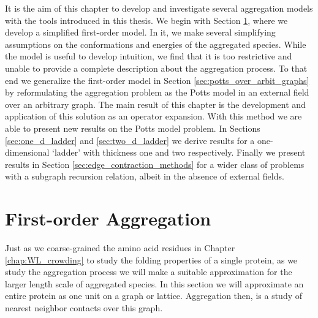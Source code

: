 It is the aim of this chapter to develop and investigate several aggregation models with the tools introduced in this thesis. We begin with Section \ref{sec:first_order_aggregation}, where we develop a simplified first-order model. In it, we make several simplifying assumptions on the conformations and energies of the aggregated species. While the model is useful to develop intuition, we find that it is too restrictive and unable to provide a complete description about the aggregation process. To that end we generalize the first-order model in Section \ref{sec:potts_over_arbit_graphs} by reformulating the aggregation problem as the Potts model in an external field over an arbitrary graph. The main result of this chapter is the development and application of this solution as an operator expansion. With this method we are able to present new results on the Potts model problem. In Sections \ref{sec:one_d_ladder} and \ref{sec:two_d_ladder} we derive results for a one-dimensional `ladder' with thickness one and two respectively. Finally we present results in Section \ref{sec:edge_contraction_methods} for a wider class of problems with a subgraph recursion relation, albeit in the absence of external fields.

\section{First-order Aggregation}
\label{sec:first_order_aggregation}

Just as we coarse-grained the amino acid residues in Chapter \ref{chap:WL_crowding} to study the folding properties of a single protein, as we study the aggregation process we will make a suitable approximation for the larger length scale of aggregated species. In this section we will approximate an entire protein as one unit on a graph or lattice. Aggregation then, is a study of nearest neighbor contacts over this graph. 

